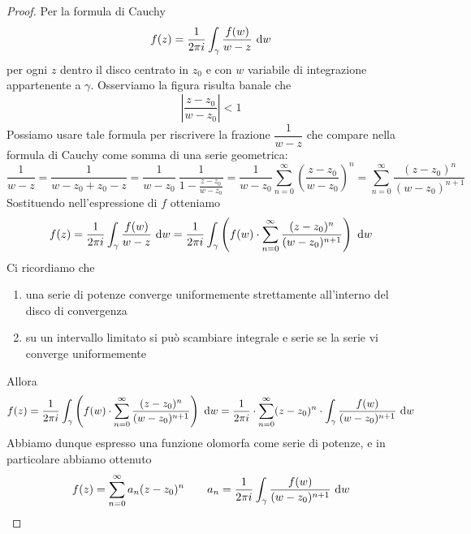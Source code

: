 \begin{proof}
Per la formula di Cauchy
\begin{equation*}
f(z) = \frac{1}{2\pi i}\int_{\gamma}\frac{f(w)}{w - z} \  \mathrm{d} w
\end{equation*}
per ogni $z$ dentro il disco centrato in $z_0$ e con $w$ variabile di integrazione appartenente a $\gamma.$
Osserviamo la figura risulta banale che
\begin{equation*}
\left| \frac{z - z_{0}}{w - z_{0}}\right| < 1
\end{equation*}
Possiamo usare tale formula per riscrivere la frazione $\dfrac{1}{w-z}$ che compare nella formula di Cauchy come somma di una serie geometrica:
$$
\frac{1}{w-z}=\frac{1}{w-z_0+z_0-z}=\frac{1}{w-z_0}\ \frac{1}{1-\frac{z-z_0}{w-z_0}}=\frac{1}{w-z_0}\sum_{n=0}^{\infty}\left(\frac{z-z_0}{w-z_0}\right)^n=\sum_{n=0}^{\infty}\frac{(z-z_0)^n}{(w-z_0)^{n+1}}
$$
Sostituendo nell'espressione di $f$ otteniamo
$$
f(z)=\frac{1}{2\pi i}\int_{\gamma}\frac{f(w)}{w-z}\  \mathrm{d} w=\frac{1}{2\pi i}\int_{\gamma}\left(f(w)\cdot \sum_{n=0}^{\infty}\frac{(z-z_0)^n}{(w-z_0)^{n+1}} \right)  \  \mathrm{d} w
$$
Ci ricordiamo che 
\begin{enumerate}
    \item una serie di potenze converge uniformemente strettamente all'interno del disco di convergenza
    \item su un intervallo limitato si può scambiare integrale e serie se la serie vi converge uniformemente
\end{enumerate}
Allora
$$
f(z)=\frac{1}{2\pi i}\int_{\gamma}\left(f(w)\cdot \sum_{n=0}^{\infty}\frac{(z-z_0)^n}{(w-z_0)^{n+1}} \right)  \  \mathrm{d} w=\frac{1}{2\pi i}\cdot \sum_{n=0}^\infty (z-z_0)^n \cdot \int_\gamma \frac{f(w)}{(w-z_0)^{n+1}}\  \mathrm{d} w
$$
Abbiamo dunque espresso una funzione olomorfa come serie di potenze, e in particolare abbiamo ottenuto
$$
f(z)=\sum_{n=0}^\infty a_n(z-z_0)^n \qquad a_n=\frac{1}{2\pi i}\int_{\gamma}\frac{f(w)}{(w-z_0)^{n+1}}\  \mathrm{d} w
$$
\end{proof}

